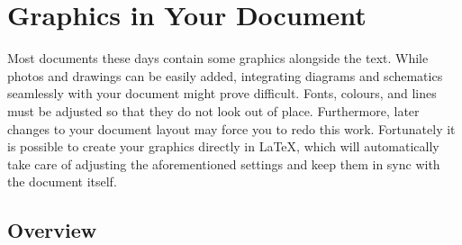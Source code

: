 %
%
%
%

\chapter{Graphics in Your Document}\label{chap:graphics}

\begin{intro}
  Most documents these days contain some graphics alongside the text. While
  photos and drawings can be easily added, integrating diagrams and schematics
  seamlessly with your document might prove difficult. Fonts, colours, and lines
  must be adjusted so that they do not look out of place. Furthermore, later
  changes to your document layout may force you to redo this work. Fortunately
  it is possible to create your graphics directly in \LaTeX{}, which will
  automatically take care of adjusting the aforementioned settings and keep
  them in sync with the document itself.
\end{intro}

\section{Overview}


